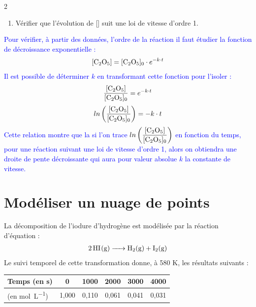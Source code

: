 \documentclass[a4paper,11pt,fleqn]{article}%
\begin{document}
\begin{multicols}{2}
\begin{enumerate}[resume]
    \item Vérifier que l'évolution de [] suit une loi de vitesse d'ordre 1.
\end{enumerate}
\textcolor{blue}{Pour vérifier, à partir des données, l'ordre de la réaction il faut  étudier la fonction de décroissance exponentielle :
$$[\ce{C2O5}] =[\ce{C2O5}]_0 \cdot e^{-k\cdot t} $$
Il est possible de déterminer $k$ en transformant cette fonction pour l'isoler :
$$\dfrac{[\ce{C2O5}]}{[\ce{C2O5}]_0} = e^{-k\cdot t}$$
$$ln\left(\dfrac{[\ce{C2O5}]}{[\ce{C2O5}]_0}\right) = -k\cdot t$$
Cette relation montre que la si l'on trace $ln\left(\dfrac{[\ce{C2O5}]}{[\ce{C2O5}]_0}\right)$ en fonction du temps, pour une réaction suivant une loi de vitesse d'ordre 1, alors on obtiendra une droite de pente décroissante qui aura pour valeur absolue $k$ la constante de vitesse.}
\begin{center}
\end{center}


\section{Modéliser un nuage de points}
La décomposition de l'iodure d'hydrogène est modélisée par la réaction d'équation :
\begin{eqnarray}
    \ce{2HI(g) -> H2(g) + I2(g)}\nonumber
\end{eqnarray}
Le suivi temporel de cette transformation donne, à \num{580} \unit{\kelvin}, les résultats suivants :
\begin{center}
    \begin{tabular}{|>{\centering}m{.15\linewidth}|c|c|c|c|c|}
    \hline Temps (en s) & 0 & 1000 & 2000 & 3000 & 4000\\
    \hline [\ce{HI}] (en \unit{\mole\per\liter}) & 1,000 & 0,110 & 0,061 & 0,041 & 0,031\\
    \hline
    \end{tabular}
\end{center}


\end{multicols}
\end{document}
